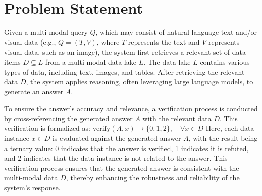 \section{Problem Statement}
\label{sec:problem}

Given a multi-modal query \( Q \), which may consist of natural language text and/or visual data (e.g., \( Q = (T, V) \), where \( T \) represents the text and \( V \) represents visual data, such as an image), the system first retrieves a relevant set of data items \( D \subseteq L \) from a multi-modal data lake \( L \). The data lake \( L \) contains various types of data, including text, images, and tables. After retrieving the relevant data \( D \), the system applies reasoning, often leveraging large language models, to generate an answer \( A \).

To ensure the answer’s accuracy and relevance, a verification process is conducted by cross-referencing the generated answer \( A \) with the relevant data \( D \). This verification is formalized as:
\(
\text{verify}(A, x) \to \{0, 1, 2\}, \quad \forall x \in D
\)
Here, each data instance \( x \in D \) is evaluated against the generated answer \( A \), with the result being a ternary value: 0 indicates that the answer is verified, 1 indicates it is refuted, and 2 indicates that the data instance is not related to the answer. This verification process ensures that the generated answer is consistent with the multi-modal data \( D \), thereby enhancing the robustness and reliability of the system's response.